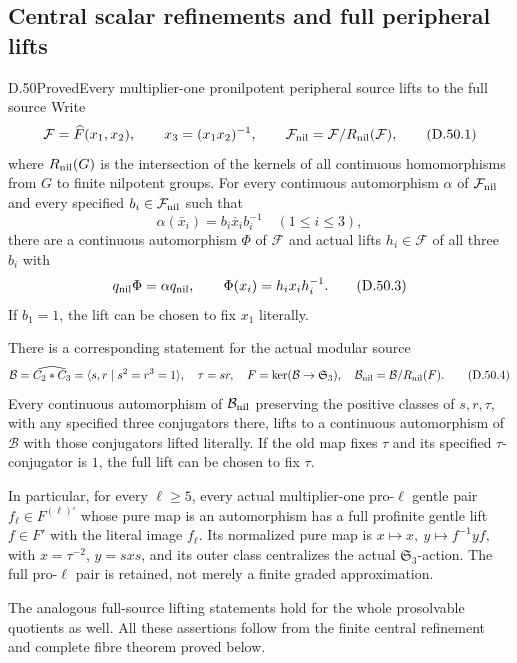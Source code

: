 \subsection{Central scalar refinements and full peripheral lifts}

\begin{statement}{D.50}{Proved}{Every multiplier-one pronilpotent peripheral source lifts to the full source}
Write
\[
 \mathcal F=\widehat F(x_1,x_2),\qquad x_3=(x_1x_2)^{-1},
 \qquad \mathcal F_{\rm nil}=\mathcal F/R_{\rm nil}(\mathcal F),
 \tag{D.50.1}
\]
where \(R_{\rm nil}(G)\) is the intersection of the kernels of all
continuous homomorphisms from \(G\) to finite nilpotent groups.
For every continuous automorphism \(\alpha\) of
\(\mathcal F_{\rm nil}\) and every specified \(b_i\in\mathcal F_{\rm nil}\)
such that
\[
          \alpha(\bar x_i)=b_i\bar x_i b_i^{-1}\quad(1\leq i\leq3),
 \tag{D.50.2}
\]
there are a continuous automorphism \(\Phi\) of \(\mathcal F\)
and actual lifts \(h_i\in\mathcal F\) of all three \(b_i\) with
\[
 q_{\rm nil}\Phi=\alpha q_{\rm nil},\qquad
                         \Phi(x_i)=h_ix_ih_i^{-1}.
 \tag{D.50.3}
\]
If \(b_1=1\), the lift can be chosen to fix \(x_1\) literally.

There is a corresponding statement for the actual modular source
\[
 \mathcal B=\widehat{C_2*C_3}=\langle s,r\mid s^2=r^3=1\rangle,
 \quad \tau=sr,\quad
 F=\ker(\mathcal B\to\mathfrak S_3),\quad
 \mathcal B_{\rm nil}=\mathcal B/R_{\rm nil}(F).
 \tag{D.50.4}
\]
Every continuous automorphism of \(\mathcal B_{\rm nil}\) preserving
the positive classes of \(s,r,\tau\), with any specified three
conjugators there, lifts to a continuous automorphism of \(\mathcal B\)
with those conjugators lifted literally. If the old map fixes \(\tau\)
and its specified \(\tau\)-conjugator is \(1\), the full lift can be
chosen to fix \(\tau\).

In particular, for every \(\ell\geq5\), every actual multiplier-one
pro-\(\ell\) gentle pair \(f_\ell\in F^{(\ell)\prime}\) whose pure
map is an automorphism has a full profinite gentle lift
\(f\in F'\) with the literal image \(f_\ell\).
Its normalized pure map is
\(x\mapsto x,\ y\mapsto f^{-1}yf\), with
\(x=\tau^{-2}\), \(y=sxs\), and its outer class centralizes the
actual \(\mathfrak S_3\)-action. The full pro-\(\ell\) pair is
retained, not merely a finite graded approximation.

The analogous full-source lifting statements hold for the whole
prosolvable quotients as well. All these assertions follow from
the finite central refinement and complete fibre theorem proved below.
\end{statement}

